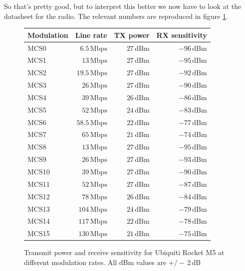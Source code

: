 So that's pretty good, but to interpret this better we now have to
look at the datasheet for the radio. The relevant numbers are
reproduced in figure \ref{fig:rocket_txrx}.
\begin{figure}[h]
  \begin{center}
    \begin{tabular}{lrrr}
      Modulation & Line rate & TX power & RX sensitivity\\
      \hline
      MCS0 & $6.5\, \mathrm{Mbps}$ & $27\, \mathrm{dBm}$ & $-96\,\mathrm{dBm}$\\
      MCS1 & $13\, \mathrm{Mbps}$ & $27\, \mathrm{dBm}$ & $-95\,\mathrm{dBm}$\\
      MCS2 & $19.5\, \mathrm{Mbps}$ & $27\, \mathrm{dBm}$ & $-92\,\mathrm{dBm}$\\
      MCS3 & $26\, \mathrm{Mbps}$ & $27\, \mathrm{dBm}$ & $-90\,\mathrm{dBm}$\\
      MCS4 & $39\, \mathrm{Mbps}$ & $26\, \mathrm{dBm}$ & $-86\,\mathrm{dBm}$\\
      MCS5 & $52\, \mathrm{Mbps}$ & $24\, \mathrm{dBm}$ & $-83\,\mathrm{dBm}$\\
      MCS6 & $58.5\, \mathrm{Mbps}$ & $22\, \mathrm{dBm}$ & $-77\,\mathrm{dBm}$\\
      MCS7 & $65\, \mathrm{Mbps}$ & $21\, \mathrm{dBm}$ & $-74\,\mathrm{dBm}$\\
      MCS8 & $13\, \mathrm{Mbps}$ & $27\, \mathrm{dBm}$ & $-95\,\mathrm{dBm}$\\
      MCS9 & $26\, \mathrm{Mbps}$ & $27\, \mathrm{dBm}$ & $-93\,\mathrm{dBm}$\\
      MCS10 & $39\, \mathrm{Mbps}$ & $27\, \mathrm{dBm}$ & $-90\,\mathrm{dBm}$\\
      MCS11 & $52\, \mathrm{Mbps}$ & $27\, \mathrm{dBm}$ & $-87\,\mathrm{dBm}$\\
      MCS12 & $78\, \mathrm{Mbps}$ & $26\, \mathrm{dBm}$ & $-84\,\mathrm{dBm}$\\
      MCS13 & $104\, \mathrm{Mbps}$ & $24\, \mathrm{dBm}$ & $-79\,\mathrm{dBm}$\\
      MCS14 & $117\, \mathrm{Mbps}$ & $22\, \mathrm{dBm}$ & $-78\,\mathrm{dBm}$\\
      MCS15 & $130\, \mathrm{Mbps}$ & $21\, \mathrm{dBm}$ & $-75\,\mathrm{dBm}$\\
    \end{tabular}
  \end{center}
    \label{fig:rocket_txrx}
  \caption{Transmit power and receive sensitivity for Ubiquiti Rocket
    M5 at different modulation rates. All $\mathrm{dBm}$ values are
    $+/-\, 2\, \mathrm{dB}$}
\end{figure}

